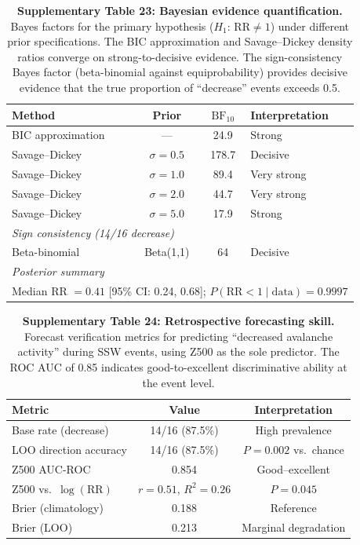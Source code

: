 \documentclass[11pt,letterpaper]{article}
\begin{document}
\begin{table}[!ht]
\centering
\caption{\textbf{Supplementary Table 23: Bayesian evidence quantification.}
Bayes factors for the primary hypothesis ($H_1$: $\mathrm{RR} \neq 1$) under different prior specifications. The BIC approximation and Savage--Dickey density ratios converge on strong-to-decisive evidence. The sign-consistency Bayes factor (beta-binomial against equiprobability) provides decisive evidence that the true proportion of ``decrease'' events exceeds 0.5.}
\label{tab:bayesian}
\small
\begin{tabular}{lccl}
\toprule
Method & Prior & $\mathrm{BF}_{10}$ & Interpretation \\
\midrule
BIC approximation & --- & 24.9 & Strong \\
Savage--Dickey & $\sigma = 0.5$ & 178.7 & Decisive \\
Savage--Dickey & $\sigma = 1.0$ & 89.4 & Very strong \\
Savage--Dickey & $\sigma = 2.0$ & 44.7 & Very strong \\
Savage--Dickey & $\sigma = 5.0$ & 17.9 & Strong \\
\midrule
\multicolumn{4}{l}{\textit{Sign consistency (14/16 decrease)}} \\
Beta-binomial & Beta(1,1) & 64 & Decisive \\
\midrule
\multicolumn{4}{l}{\textit{Posterior summary}} \\
\multicolumn{4}{l}{Median RR $= 0.41$ [95\% CI: 0.24, 0.68]; $P(\mathrm{RR} < 1 \mid \mathrm{data}) = 0.9997$} \\
\bottomrule
\end{tabular}
\end{table}

\begin{table}[!ht]
\centering
\caption{\textbf{Supplementary Table 24: Retrospective forecasting skill.}
Forecast verification metrics for predicting ``decreased avalanche activity'' during SSW events, using Z500 as the sole predictor. The ROC AUC of 0.85 indicates good-to-excellent discriminative ability at the event level.}
\label{tab:forecast_skill}
\small
\begin{tabular}{lcc}
\toprule
Metric & Value & Interpretation \\
\midrule
Base rate (decrease) & 14/16 (87.5\%) & High prevalence \\
LOO direction accuracy & 14/16 (87.5\%) & $P = 0.002$ vs.\ chance \\
Z500 AUC-ROC & 0.854 & Good--excellent \\
Z500 vs.\ $\log(\mathrm{RR})$ & $r = 0.51$, $R^2 = 0.26$ & $P = 0.045$ \\
Brier (climatology) & 0.188 & Reference \\
Brier (LOO) & 0.213 & Marginal degradation \\
\bottomrule
\end{tabular}
\end{table}
\end{document}
